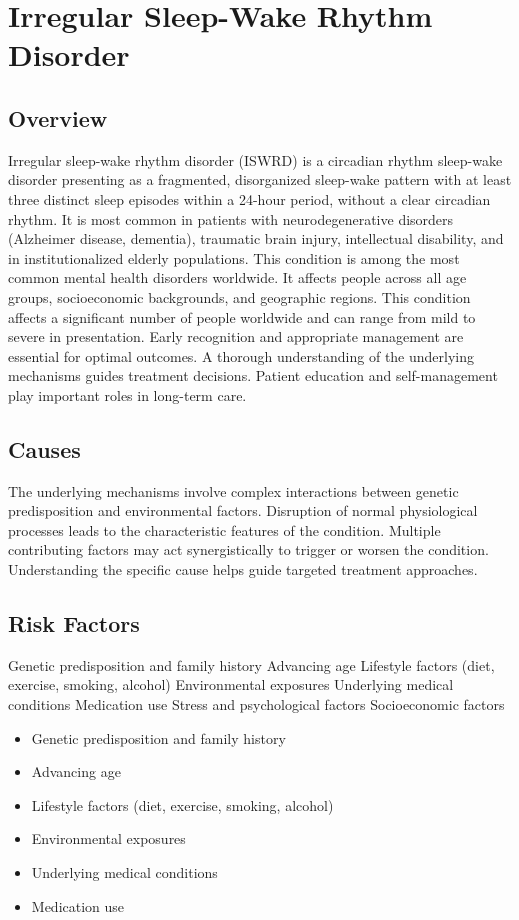 \chapter{Irregular Sleep-Wake Rhythm Disorder}
\label{sec:Irregular Sleep-Wake Rhythm Disorder}

\section{Overview}
Irregular sleep-wake rhythm disorder (ISWRD) is a circadian rhythm sleep-wake disorder presenting as a fragmented, disorganized sleep-wake pattern with at least three distinct sleep episodes within a 24-hour period, without a clear circadian rhythm. It is most common in patients with neurodegenerative disorders (Alzheimer disease, dementia), traumatic brain injury, intellectual disability, and in institutionalized elderly populations. This condition is among the most common mental health disorders worldwide. It affects people across all age groups, socioeconomic backgrounds, and geographic regions. This condition affects a significant number of people worldwide and can range from mild to severe in presentation. Early recognition and appropriate management are essential for optimal outcomes. A thorough understanding of the underlying mechanisms guides treatment decisions. Patient education and self-management play important roles in long-term care.
\section{Causes}
The underlying mechanisms involve complex interactions between genetic predisposition and environmental factors. Disruption of normal physiological processes leads to the characteristic features of the condition. Multiple contributing factors may act synergistically to trigger or worsen the condition. Understanding the specific cause helps guide targeted treatment approaches.
\section{Risk Factors}
Genetic predisposition and family history Advancing age Lifestyle factors (diet, exercise, smoking, alcohol) Environmental exposures Underlying medical conditions Medication use Stress and psychological factors Socioeconomic factors

\begin{itemize}[noitemsep]
  \item Genetic predisposition and family history
  \item Advancing age
  \item Lifestyle factors (diet, exercise, smoking, alcohol)
  \item Environmental exposures
  \item Underlying medical conditions
  \item Medication use
\end{itemize}
